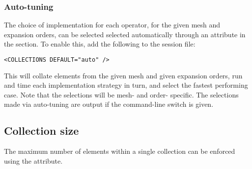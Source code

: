 \subsubsection{Auto-tuning}
The choice of implementation for each operator, for the given mesh and
expansion orders, can be selected selected automatically through an
attribute in the  section. To enable this, add the
following to the \nekpp session file:

\begin{lstlisting}[style=XmlStyle]
<COLLECTIONS DEFAULT="auto" />
\end{lstlisting}

This will collate elements from the given mesh and given expansion orders,
run and time each implementation strategy in turn, and select the fastest
performing case. Note that the selections will be mesh- and order- specific.
The selections made via auto-tuning are output if the 
command-line switch is given.

\subsection{Collection size}
The maximum number of elements within a single collection can be
enforced using the  attribute.

